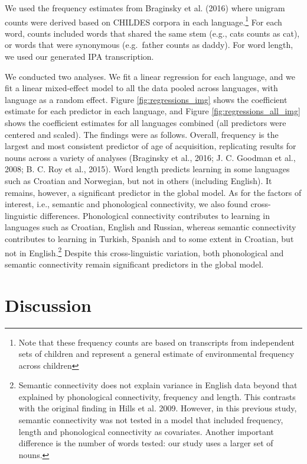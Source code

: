 \documentclass[10pt, letterpaper]{article}
\begin{document}
We used the frequency estimates from Braginsky et al. (2016) where
unigram counts were derived based on CHILDES corpora in each
language.\footnote{Note that these frequency counts are based on transcripts from independent sets of children and represent a general estimate of environmental frequency across children}
For each word, counts included words that shared the same stem (e.g.,
cats counts as cat), or words that were synonymous (e.g.~father counts
as daddy). For word length, we used our generated IPA transcription.

We conducted two analyses. We fit a linear regression for each language,
and we fit a linear mixed-effect model to all the data pooled across
languages, with language as a random effect. Figure
\ref{fig:regressions_img} shows the coefficient estimate for each
predictor in each language, and Figure \ref{fig:regressions_all_img}
shows the coefficient estimates for all languages combined (all
predictors were centered and scaled). The findings were as follows.
Overall, frequency is the largest and most consistent predictor of age
of acquisition, replicating results for nouns across a variety of
analyses (Braginsky et al., 2016; J. C. Goodman et al., 2008; B. C. Roy
et al., 2015). Word length predicts learning in some languages such as
Croatian and Norwegian, but not in others (including English). It
remains, however, a significant predictor in the global model. As for
the factors of interest, i.e., semantic and phonological connectivity,
we also found cross-linguistic differences. Phonological connectivity
contributes to learning in languages such as Croatian, English and
Russian, whereas semantic connectivity contributes to learning in
Turkish, Spanish and to some extent in Croatian, but not in
English.\footnote{Semantic connectivity does not explain variance in English data beyond that explained by phonological connectivity, frequency and length. This contrasts with the original finding in Hills et al. 2009. However, in this previous study, semantic connectivity was not tested in a model that included frequency, length and phonological connectivity as covariates. Another important difference is the number of words tested: our study uses a larger set of nouns.}
Despite this cross-linguistic variation, both phonological and semantic
connectivity remain significant predictors in the global model.

\section{Discussion}\label{discussion}
\end{document}
